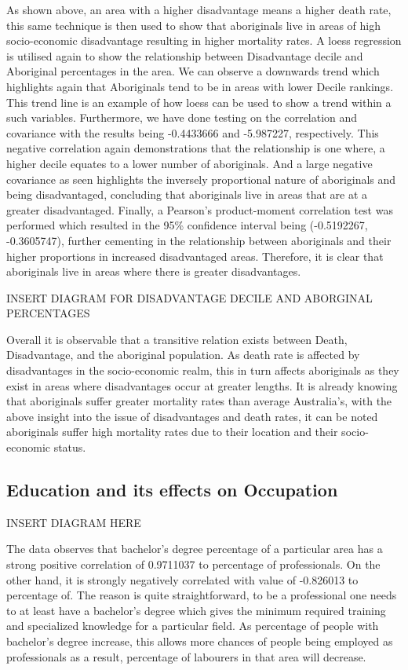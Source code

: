 \documentclass[12pt,a4paper]{article}
\begin{document}
	As shown above, an area with a higher disadvantage means a higher death rate, this same technique is then used to show that aboriginals live in areas of high socio-economic disadvantage resulting in higher mortality rates. A loess regression is utilised again to show the relationship between Disadvantage decile and Aboriginal percentages in the area. We can observe a downwards trend which highlights again that Aboriginals tend to be in areas with lower Decile rankings. This trend line is an example of how loess can be used to show a trend within a such variables. Furthermore, we have done testing on the correlation and covariance with the results being -0.4433666 and -5.987227, respectively. This negative correlation again demonstrations that the relationship is one where, a higher decile equates to a lower number of aboriginals. And a large negative covariance as seen highlights the inversely proportional nature of aboriginals and being disadvantaged, concluding that aboriginals live in areas that are at a greater disadvantaged. Finally, a Pearson’s product-moment correlation test was performed which resulted in the 95\% confidence interval being (-0.5192267, -0.3605747), further cementing in the relationship between aboriginals and their higher proportions in increased disadvantaged areas. Therefore, it is clear that aboriginals live in areas where there is greater disadvantages.
	
	INSERT DIAGRAM FOR DISADVANTAGE DECILE AND ABORGINAL PERCENTAGES
	
	Overall it is observable that a transitive relation exists between Death, Disadvantage, and the aboriginal population. As death rate is affected by disadvantages in the socio-economic realm, this in turn affects aboriginals as they exist in areas where disadvantages occur at greater lengths.  It is already knowing that aboriginals suffer greater mortality rates than average Australia’s, with the above insight into the issue of disadvantages and death rates, it can be noted aboriginals suffer high mortality rates due to their location and their socio-economic status.
	\subsection{Education and its effects on Occupation}
	INSERT DIAGRAM HERE
	
	The data observes that bachelor’s degree percentage of a particular area has a strong positive correlation of 0.9711037 to percentage of professionals. On the other hand, it is strongly negatively correlated with value of -0.826013 to percentage of. The reason is quite straightforward, to be a professional one needs to at least have a bachelor’s degree which gives the minimum required training and specialized knowledge for a particular field. As percentage of people with bachelor’s degree increase, this allows more chances of people being employed as professionals as a result, percentage of labourers in that area will decrease.
	
\end{document}
